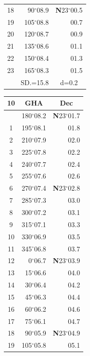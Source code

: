 \documentclass[10pt, a4paper]{report}
\begin{document}
\begin{scriptsize}
\begin{tabular*}{0.2\textwidth}[t]{@{\extracolsep{\fill}}|c|rr|}
18 & 90$^\circ$08.9 & \textbf{N}23$^\circ$00.5\\
19 & 105$^\circ$08.8 & 00.7\\
20 & 120$^\circ$08.7 & 00.9\\
21 & 135$^\circ$08.6 & \raisebox{0.24ex}{\boldmath$\cdot$~\boldmath$\cdot$~~}01.1\\
22 & 150$^\circ$08.4 & 01.3\\
23 & 165$^\circ$08.3 & 01.5\\
\hline
\rule{0pt}{2.4ex} & \multicolumn{1}{c}{SD.=15.8} & \multicolumn{1}{c|}{d=0.2}\\
\hline
\end{tabular*}\noindent
\begin{tabular*}{0.2\textwidth}[t]{@{\extracolsep{\fill}}|c|rr|}
\hline
\multicolumn{1}{|c|}{\rule{0pt}{2.6ex}\textbf{10}} & \multicolumn{1}{c}{\textbf{GHA}} & \multicolumn{1}{c|}{\textbf{Dec}}\\
\hline\rule{0pt}{2.6ex}\noindent
0 & 180$^\circ$08.2 & \textbf{N}23$^\circ$01.7\\
1 & 195$^\circ$08.1 & 01.8\\
2 & 210$^\circ$07.9 & 02.0\\
3 & 225$^\circ$07.8 & \raisebox{0.24ex}{\boldmath$\cdot$~\boldmath$\cdot$~~}02.2\\
4 & 240$^\circ$07.7 & 02.4\\
5 & 255$^\circ$07.6 & 02.6\\[2Pt]
6 & 270$^\circ$07.4 & \textbf{N}23$^\circ$02.8\\
7 & 285$^\circ$07.3 & 03.0\\
8 & 300$^\circ$07.2 & 03.1\\
9 & 315$^\circ$07.1 & \raisebox{0.24ex}{\boldmath$\cdot$~\boldmath$\cdot$~~}03.3\\
10 & 330$^\circ$06.9 & 03.5\\
11 & 345$^\circ$06.8 & 03.7\\[2Pt]
12 & 0$^\circ$06.7 & \textbf{N}23$^\circ$03.9\\
13 & 15$^\circ$06.6 & 04.0\\
14 & 30$^\circ$06.4 & 04.2\\
15 & 45$^\circ$06.3 & \raisebox{0.24ex}{\boldmath$\cdot$~\boldmath$\cdot$~~}04.4\\
16 & 60$^\circ$06.2 & 04.6\\
17 & 75$^\circ$06.1 & 04.7\\[2Pt]
18 & 90$^\circ$05.9 & \textbf{N}23$^\circ$04.9\\
19 & 105$^\circ$05.8 & 05.1\\

\end{tabular*}
\end{scriptsize}
\end{document}
